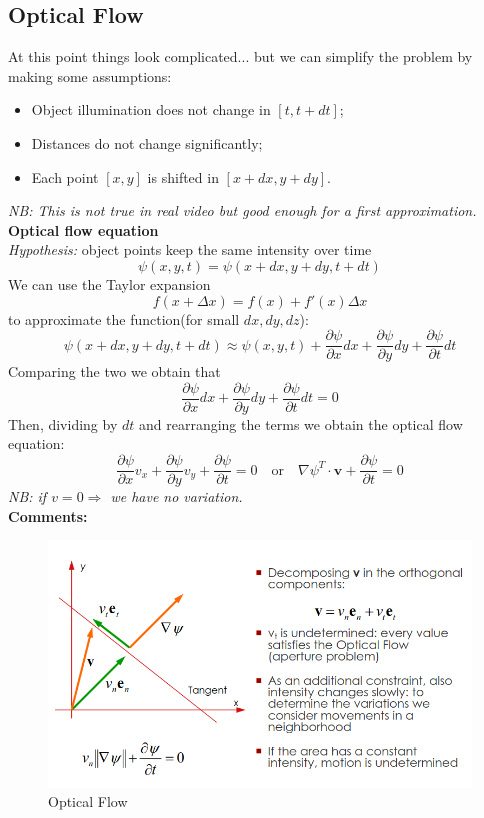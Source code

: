 \subsection{Optical Flow}
At this point things look complicated... but we can simplify the problem by making some assumptions:
\begin{itemize}
    \item Object illumination does not change in $[t, t + dt]$;
    \item Distances do not change significantly;
    \item Each point $[x,y]$ is shifted in $[x + dx, y + dy]$.
\end{itemize}
\textit{NB: This is not true in real video but good enough for a first approximation.}
\\\textbf{Optical flow equation}
\\\textit{Hypothesis:} object points keep the same intensity over time\\
\[
    \psi(x,y,t) = \psi(x + dx, y + dy, t + dt)
\]
We can use the Taylor expansion\[f(x + \Delta x) =f(x)+f'(x)\Delta x\] to approximate the function(for small $dx, dy, dz$):
\[
    \psi(x + dx, y + dy, t + dt) \approx \psi(x,y,t) + \frac{\partial \psi}{\partial x}dx + \frac{\partial \psi}{\partial y}dy + \frac{\partial \psi}{\partial t}dt
\]
Comparing the two we obtain that 
\[
    \frac{\partial \psi}{\partial x}dx + \frac{\partial \psi}{\partial y}dy + \frac{\partial \psi}{\partial t}dt = 0
\]
Then, dividing by $dt$ and rearranging the terms we obtain the optical flow equation:
\[
    \frac{\partial \psi}{\partial x}v_x + \frac{\partial \psi}{\partial y}v_y + \frac{\partial \psi}{\partial t} = 0 \quad \text{or} \quad \nabla \psi ^{T} \cdot \mathbf{v} + \frac{\partial \psi}{\partial t} = 0
\]
\textit{NB: if $v=0 \Rightarrow$ we have no variation.}
\\\textbf{Comments:}
\begin{figure}[h]
    \centering
    \includegraphics[scale=0.35]{Figures/OpticalFlow.png}
    \caption{Optical Flow}
\end{figure}
